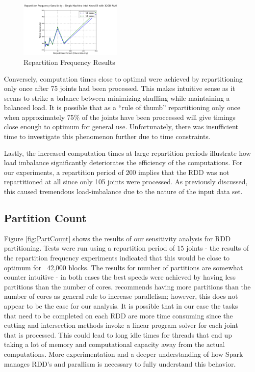 \begin{figure}
  \centering
  \includegraphics[width=0.45\textwidth]{FrequencySensitivity}
  \caption{Repartition Frequency Results}
  \label{fig:FrequencySensitivity}
\end{figure}

Conversely, computation times close to optimal were achieved by repartitioning only once after 75 joints had been processed. This makes intuitive sense as it seems to strike a balance between minimizing shuffling  while  maintaining a balanced load. It is possible that as a ``rule of thumb'' repartitioning only once when approximately 75\% of the joints have been proccessed will give timings close enough to optimum for general use. Unfortunately, there was insufficient time to investigate this phenomenon further due to time constraints. \par

Lastly, the increased computation times at large repartition periods illustrate how load imbalance significantly deteriorates the efficiency of the computations. For our experiments, a repartition period of 200 implies that the RDD was not repartitioned at all since only 105 joints were processed. As previously discussed, this caused tremendous load-imbalance due to the nature of the input data set. \par

\subsection{Partition Count}
Figure \ref{fig:PartCount} shows the results of our sensitivity analysis for RDD partitioning. Tests were run using a repartition period of 15 joints - the results of the repartition frequency experiments indicated that this would be close to optimum for ~42,000 blocks. The results for number of partitions are somewhat counter intuitive - in both cases the best speeds were achieved by having less partitions than the number of cores. \cite{sparkTuning} recommends having more partitions than the number of cores as general rule to increase parallelism; however, this does not appear to be the case for our analysis. It is possible that in our case the tasks that need to be completed on each RDD are more time consuming since the cutting and intersection methods invoke a linear program solver for each joint that is processed. This could lead to long idle times for threads that end up taking a lot of memory and computational capacity away from the actual computations. More experimentation and a deeper understanding of how Spark manages RDD's and parallism is necessary to fully understand this behavior. \par

